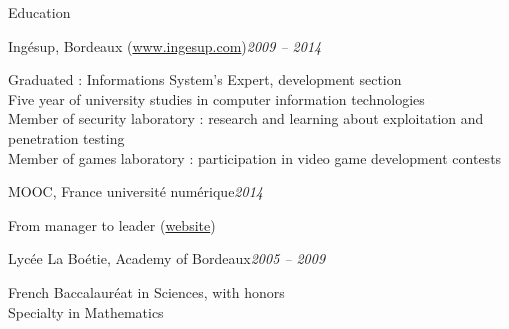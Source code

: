 \begin{rSection}{Education}

  \begin{rSubsection}{Ing\'{e}sup, Bordeaux (\href{www.ingesup.com}{www.ingesup.com})}{\em 2009 -- 2014}{}{}
    \item[] Graduated : Informations System's Expert, development section \\
    Five year of university studies in computer information technologies \\
    Member of security laboratory : research and learning about exploitation and penetration testing \\
    Member of games laboratory : participation in video game development contests
  \end{rSubsection}

  \begin{rSubsection}{MOOC, France universit\'{e} num\'{e}rique}{\em 2014}{}{}
    \item[] From manager to leader (\href{https://www.france-universite-numerique-mooc.fr/courses/CNAM/01002/Trimestre_1_2014/about}{website})
  \end{rSubsection}

  \begin{rSubsection}{Lyc\'{e}e La Bo\'{e}tie, Academy of Bordeaux}{\em 2005 -- 2009}{}{}
    \item[] French Baccalaur\'{e}at in Sciences, with honors \\
    Specialty in Mathematics
  \end{rSubsection}

\end{rSection}
